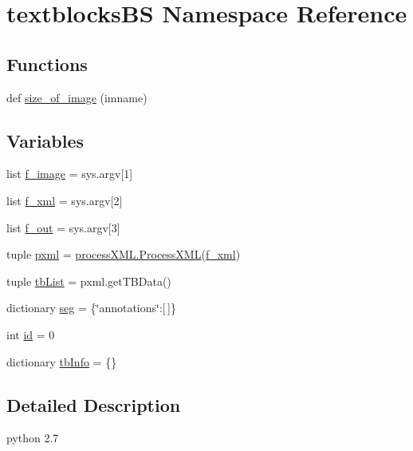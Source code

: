 \hypertarget{namespacetextblocks_b_s}{}\section{textblocks\+B\+S Namespace Reference}
\label{namespacetextblocks_b_s}
\subsection*{Functions}
\begin{DoxyCompactItemize}
\item 
def \hyperlink{namespacetextblocks_b_s_a0519a1167dd018e2713b02ea6c643b9e}{size\+\_\+of\+\_\+image} (imname)
\end{DoxyCompactItemize}
\subsection*{Variables}
\begin{DoxyCompactItemize}
\item 
list \hyperlink{namespacetextblocks_b_s_aa4199960b0f30691273afab55f9c015b}{f\+\_\+image} = sys.\+argv\mbox{[}1\mbox{]}
\item 
list \hyperlink{namespacetextblocks_b_s_a0b96fe39cf2a7ad26b3a84454c6ddb52}{f\+\_\+xml} = sys.\+argv\mbox{[}2\mbox{]}
\item 
list \hyperlink{namespacetextblocks_b_s_a6bb0bbe4ddc0fc0001bf73831defa8e1}{f\+\_\+out} = sys.\+argv\mbox{[}3\mbox{]}
\item 
tuple \hyperlink{namespacetextblocks_b_s_ac3d5f32f9bba2376d6fb4def7fcd2a7c}{pxml} = \hyperlink{classprocess_x_m_l_1_1_process_x_m_l}{process\+X\+M\+L.\+Process\+X\+M\+L}(\hyperlink{namespacetextblocks_b_s_a0b96fe39cf2a7ad26b3a84454c6ddb52}{f\+\_\+xml})
\item 
tuple \hyperlink{namespacetextblocks_b_s_a0853163bb6caefb45dce81554085dc68}{tb\+List} = pxml.\+get\+T\+B\+Data()
\item 
dictionary \hyperlink{namespacetextblocks_b_s_ab8e8106d797a26f0347a5f3e8968588c}{seg} = \{\char`\"{}annotations\char`\"{}\+:\mbox{[}$\,$\mbox{]}\}
\item 
int \hyperlink{namespacetextblocks_b_s_a48505fdd626c2db822b34807b7369490}{id} = 0
\item 
dictionary \hyperlink{namespacetextblocks_b_s_a5be6e90dda43df099e0944d4f14df97e}{tb\+Info} = \{\}
\end{DoxyCompactItemize}


\subsection{Detailed Description}
\begin{DoxyVerb}python 2.7 \end{DoxyVerb}
 


